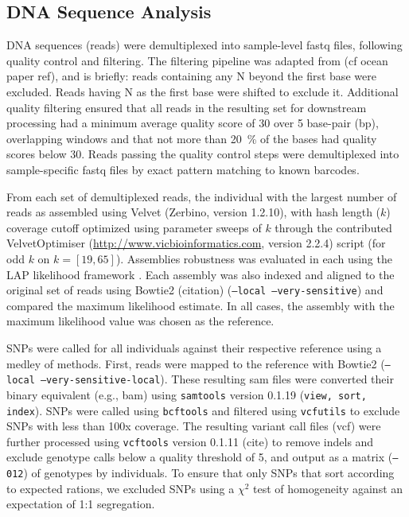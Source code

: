 \documentclass[11pt]{article}
\begin{document}
\subsection*{DNA Sequence Analysis}

DNA sequences (reads) were demultiplexed into sample-level fastq files, following quality control 
and filtering.  The filtering pipeline was adapted from (cf ocean paper ref), and is briefly: reads 
containing any N beyond the first base were excluded. Reads having N as the first base were shifted 
to exclude it.  Additional quality filtering ensured that all reads in the resulting set for downstream 
processing had a minimum average quality score of 30 over 5 base-pair (bp), overlapping windows 
and that not more than \SI{20}{\percent} of the bases had quality scores below 30. Reads passing the 
quality control steps were demultiplexed into sample-specific fastq files by exact pattern matching to 
known barcodes.

From each set of demultiplexed reads, the individual with the largest number of reads as assembled using 
Velvet (Zerbino, version 1.2.10), with hash length ($k$) coverage cutoff optimized using parameter sweeps of $k$ 
through the contributed VelvetOptimiser (\url{http://www.vicbioinformatics.com}, version 2.2.4) 
script (for odd $k$ on $k=[19,65]$).  Assemblies robustness was evaluated in each using the LAP likelihood 
framework \citep{Ghodsi:2013bc}.  Each assembly was also indexed and aligned to the original set of reads 
using Bowtie2 (citation) (\texttt{--local --very-sensitive}) and compared the maximum likelihood estimate. 
In all cases, the assembly with the maximum likelihood value was chosen as the reference.

SNPs were called for all individuals against their respective reference using a medley of methods.  First, 
reads were mapped to the reference with Bowtie2 (\texttt{--local --very-sensitive-local}).  These resulting 
sam files were converted their binary equivalent (e.g., bam) using \texttt{samtools} version 0.1.19 
(\texttt{view, sort, index}).  SNPs were called using \texttt{bcftools} and filtered using 
\texttt{vcfutils} to exclude SNPs with less than 100x coverage. The resulting variant call files (vcf) 
were further processed using \texttt{vcftools} version 0.1.11 (cite) to remove indels and exclude genotype 
calls below a quality threshold of 5, and output as a matrix (\texttt{--012}) of genotypes by individuals.  
To ensure that only SNPs that sort according to expected rations, we excluded SNPs using a $\chi^2$ test of 
homogeneity against an expectation of 1:1 segregation.
\end{document}

